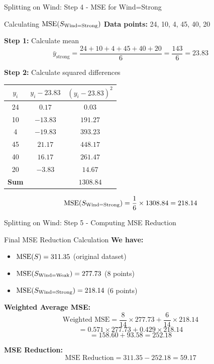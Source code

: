 \documentclass[usenames,dvipsnames]{beamer}
\begin{document}
\begin{frame}{Splitting on Wind: Step 4 - MSE for Wind=Strong}
\begin{examplebox}{Calculating $\operatorname{MSE}(S_{\text{Wind=Strong}})$}
\textbf{Data points:} 24, 10, 4, 45, 40, 20

\pause
\textbf{Step 1:} Calculate mean
\[
\bar{y}_{\text{strong}} = \frac{24 + 10 + 4 + 45 + 40 + 20}{6} = \frac{143}{6} = 23.83
\]

\pause
\textbf{Step 2:} Calculate squared differences
\scriptsize
\begin{tabular}{|c|c|c|}
\hline
$y_i$ & $y_i - 23.83$ & $(y_i - 23.83)^2$ \\ \hline
24 & $0.17$ & $0.03$ \\
10 & $-13.83$ & $191.27$ \\
4 & $-19.83$ & $393.23$ \\
45 & $21.17$ & $448.17$ \\
40 & $16.17$ & $261.47$ \\
20 & $-3.83$ & $14.67$ \\ \hline
\textbf{Sum} & & $\mathbf{1308.84}$ \\
\hline
\end{tabular}

\pause
\[
\operatorname{MSE}(S_{\text{Wind=Strong}}) = \frac{1}{6} \times 1308.84 = 218.14
\]
\end{examplebox}
\end{frame}

\begin{frame}{Splitting on Wind: Step 5 - Computing MSE Reduction}
\begin{examplebox}{Final MSE Reduction Calculation}
\textbf{We have:}
\begin{itemize}
	\item $\operatorname{MSE}(S) = 311.35$ (original dataset)
	\item $\operatorname{MSE}(S_{\text{Wind=Weak}}) = 277.73$ (8 points)
	\item $\operatorname{MSE}(S_{\text{Wind=Strong}}) = 218.14$ (6 points)
\end{itemize}

\pause
\textbf{Weighted Average MSE:}
\[
\text{Weighted MSE} = \frac{8}{14} \times 277.73 + \frac{6}{14} \times 218.14
\]
\pause
\[
= 0.571 \times 277.73 + 0.429 \times 218.14
\]
\pause
\[
= 158.60 + 93.58 = 252.18
\]

\pause
\textbf{MSE Reduction:}
\[
\text{MSE Reduction} = 311.35 - 252.18 = \mathbf{59.17}
\]
\end{examplebox}
\end{frame}
\end{document}
